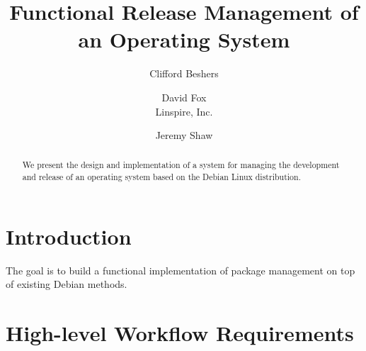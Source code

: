 \documentclass[12pt]{article}
\title{Functional Release Management of an Operating System}
\author{Clifford Beshers \and David Fox  \\ Linspire, Inc. \and Jeremy Shaw}
\begin{document}
  \maketitle
  \begin{abstract}
    We present the design and implementation of a system for managing
    the development and release of an operating system based on the
    Debian Linux distribution.
  \end{abstract}

\section{Introduction}
The goal is to build a functional implementation of package management
on top of existing Debian methods.

\section{High-level Workflow Requirements}
\end{document}
